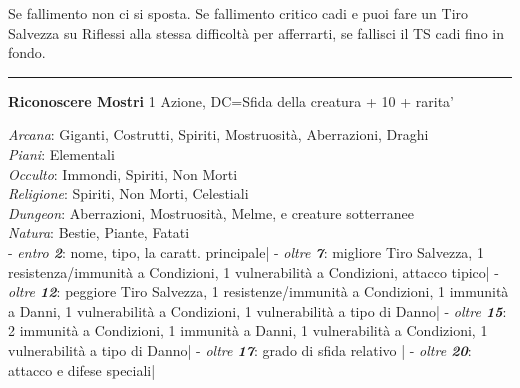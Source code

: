 \documentclass[a4paper,12 pt,openany]{book}
\newcommand{\riga}{\rule{\textwidth}{0.4pt}}
\begin{document}
\begin{textblock*}{7.4cm}
Se fallimento non ci si sposta. Se fallimento critico cadi e puoi fare un Tiro Salvezza su Riflessi alla stessa difficoltà per afferrarti, se fallisci il TS cadi fino in fondo. 

\riga


\textbf{Riconoscere Mostri} 1 Azione, 	DC=Sfida della creatura + 10 + rarita'
	
\textit{Arcana}: Giganti, Costrutti, Spiriti, Mostruosità, Aberrazioni, Draghi\\
\textit{Piani}: Elementali\\
\textit{Occulto}: Immondi, Spiriti, Non Morti\\
\textit{Religione}: Spiriti, Non Morti, Celestiali\\
\textit{Dungeon}: Aberrazioni, Mostruosità, Melme, e creature sotterranee\\
\textit{Natura}: Bestie, Piante, Fatati\\
	
- \textit{entro \textbf{2}}: nome, tipo, la caratt. principale|
- \textit{oltre \textbf{7}}: migliore Tiro Salvezza, 1 resistenza/immunità a Condizioni, 1 vulnerabilità a Condizioni, attacco tipico|
- \textit{oltre \textbf{12}}: peggiore Tiro Salvezza, 1 resistenze/immunità a Condizioni, 1 immunità a Danni, 1 vulnerabilità a Condizioni, 1 vulnerabilità a tipo di Danno|
- \textit{oltre \textbf{15}}: 2 immunità a Condizioni, 1 immunità a Danni, 1 vulnerabilità a Condizioni, 1 vulnerabilità a tipo di Danno|
- \textit{oltre \textbf{17}}: grado di sfida relativo |
- \textit{oltre \textbf{20}}: attacco e difese speciali|
	

\end{textblock*}
\end{document}
